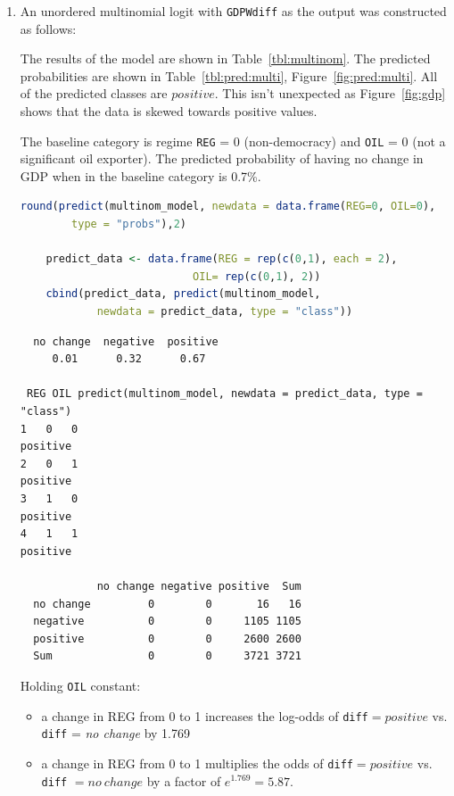 \documentclass[12pt,letterpaper]{article}
\begin{document}

\begin{enumerate}
	\item An unordered multinomial logit with \texttt{GDPWdiff} as the output was constructed as follows:
    

	The results of the model are shown in Table~\ref{tbl:multinom}.  The predicted probabilities are shown in Table~\ref{tbl:pred:multi}, Figure~\ref{fig:pred:multi}.  All of the predicted classes are $positive$.  This isn't unexpected as Figure~\ref{fig:gdp} shows that the data is skewed towards positive values.
	
  

	The baseline category is regime \texttt{REG} = 0 (non-democracy) and \texttt{OIL} = 0 (not a significant oil exporter).  The predicted probability of having no change in GDP when in the baseline category is 0.7\%.

  \begin{lstlisting}[language=R]
  	round(predict(multinom_model, newdata = data.frame(REG=0, OIL=0),
        type = "probs"),2)

    predict_data <- data.frame(REG = rep(c(0,1), each = 2), 
                           OIL= rep(c(0,1), 2))
    cbind(predict_data, predict(multinom_model,
            newdata = predict_data, type = "class"))
  \end{lstlisting}
  \begin{lstlisting}
  no change  negative  positive 
     0.01      0.32      0.67 

 REG OIL predict(multinom_model, newdata = predict_data, type = "class")
1   0   0                                                        positive
2   0   1                                                        positive
3   1   0                                                        positive
4   1   1                                                        positive

            no change negative positive  Sum
  no change         0        0       16   16
  negative          0        0     1105 1105
  positive          0        0     2600 2600
  Sum               0        0     3721 3721
  \end{lstlisting}
	
  

  Holding \texttt{OIL} constant:
  \begin{itemize}
    \item a change in REG from 0 to 1 increases the log-odds of  \texttt{diff}$ = positive$ vs. \texttt{diff} = \emph{no change} by 1.769
    \item a change in REG from 0 to 1 multiplies the odds of \texttt{diff}$ = positive$ vs. \texttt{diff} $= no~change$ by a factor of $e^{1.769} = 5.87$.
  \end{itemize}


\end{enumerate}
\end{document}
